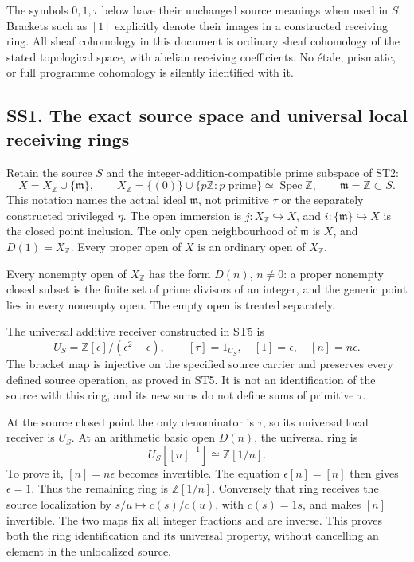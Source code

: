 The symbols \(0,1,\tau\) below have their unchanged source meanings when
used in \(S\). Brackets such as \([1]\) explicitly denote their images
in a constructed receiving ring. All sheaf cohomology in this document
is ordinary sheaf cohomology of the stated topological space, with
abelian receiving coefficients. No étale, prismatic, or full programme
cohomology is silently identified with it.

\subsection{SS1. The exact source space and universal local receiving
rings}\label{ss1.-the-exact-source-space-and-universal-local-receiving-rings}

Retain the source \(S\) and the integer-addition-compatible prime
subspace of ST2: \[
 X=X_{\mathbb Z}\cup\{\mathfrak m\},\qquad
 X_{\mathbb Z}=\{(0)\}\cup\{p\mathbb Z:p\text{ prime}\}
 \simeq\operatorname{Spec}\mathbb Z,\qquad
 \mathfrak m=\mathbb Z\subset S.
\tag{SS1.1}
\] This notation names the actual ideal \(\mathfrak m\), not primitive
\(\tau\) or the separately constructed privileged \(\eta\). The open
immersion is \(j:X_{\mathbb Z}\hookrightarrow X\), and
\(i:\{\mathfrak m\}\hookrightarrow X\) is the closed point inclusion.
The only open neighbourhood of \(\mathfrak m\) is \(X\), and
\(D(1)=X_{\mathbb Z}\). Every proper open of \(X\) is an ordinary open
of \(X_{\mathbb Z}\).

Every nonempty open of \(X_{\mathbb Z}\) has the form \(D(n)\),
\(n\ne0\): a proper nonempty closed subset is the finite set of prime
divisors of an integer, and the generic point lies in every nonempty
open. The empty open is treated separately.

The universal additive receiver constructed in ST5 is \[
 U_S=\mathbb Z[\epsilon]/(\epsilon^2-\epsilon),\qquad
 [\tau]=1_{U_S},\quad[1]=\epsilon,\quad[n]=n\epsilon.
\tag{SS1.2}
\] The bracket map is injective on the specified source carrier and
preserves every defined source operation, as proved in ST5. It is not an
identification of the source with this ring, and its new sums do not
define sums of primitive \(\tau\).

At the source closed point the only denominator is \(\tau\), so its
universal local receiver is \(U_S\). At an arithmetic basic open
\(D(n)\), the universal ring is \[
 U_S[[n]^{-1}]\cong\mathbb Z[1/n].
\tag{SS1.3}
\] To prove it, \([n]=n\epsilon\) becomes invertible. The equation
\(\epsilon[n]=[n]\) then gives \(\epsilon=1\). Thus the remaining ring
is \(\mathbb Z[1/n]\). Conversely that ring receives the source
localization by \(s/u\mapsto c(s)/c(u)\), with \(c(s)=1s\), and makes
\([n]\) invertible. The two maps fix all integer fractions and are
inverse. This proves both the ring identification and its universal
property, without cancelling an element in the unlocalized source.

